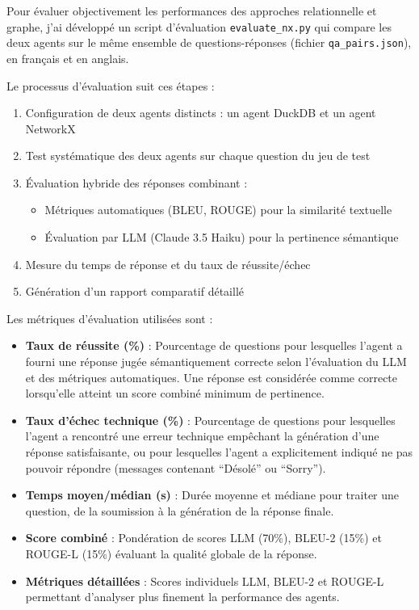 \documentclass[a4paper,11pt]{article}
\begin{document}
Pour évaluer objectivement les performances des approches relationnelle et graphe, j'ai développé un script d'évaluation \texttt{evaluate\_nx.py} qui compare les deux agents sur le même ensemble de questions-réponses (fichier \texttt{qa\_pairs.json}), en français et en anglais.

Le processus d'évaluation suit ces étapes :

\begin{enumerate}
    \item Configuration de deux agents distincts : un agent DuckDB et un agent NetworkX
    \item Test systématique des deux agents sur chaque question du jeu de test
    \item Évaluation hybride des réponses combinant :
    \begin{itemize}
        \item Métriques automatiques (BLEU, ROUGE) pour la similarité textuelle
        \item Évaluation par LLM (Claude 3.5 Haiku) pour la pertinence sémantique
    \end{itemize}
    \item Mesure du temps de réponse et du taux de réussite/échec
    \item Génération d'un rapport comparatif détaillé
\end{enumerate}

Les métriques d'évaluation utilisées sont :

\begin{itemize}
    \item \textbf{Taux de réussite (\%)} : Pourcentage de questions pour lesquelles l'agent a fourni une réponse jugée sémantiquement correcte selon l'évaluation du LLM et des métriques automatiques. Une réponse est considérée comme correcte lorsqu'elle atteint un score combiné minimum de pertinence.
    
    \item \textbf{Taux d'échec technique (\%)} : Pourcentage de questions pour lesquelles l'agent a rencontré une erreur technique empêchant la génération d'une réponse satisfaisante, ou pour lesquelles l'agent a explicitement indiqué ne pas pouvoir répondre (messages contenant \enquote{Désolé} ou \enquote{Sorry}).
    
    \item \textbf{Temps moyen/médian (s)} : Durée moyenne et médiane pour traiter une question, de la soumission à la génération de la réponse finale.
    
    \item \textbf{Score combiné} : Pondération de scores LLM (70\%), BLEU-2 (15\%) et ROUGE-L (15\%) évaluant la qualité globale de la réponse.
    
    \item \textbf{Métriques détaillées} : Scores individuels LLM, BLEU-2 et ROUGE-L permettant d'analyser plus finement la performance des agents.
\end{itemize}
\end{document}
